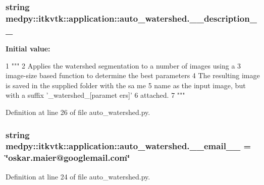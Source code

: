 \hypertarget{namespacemedpy_1_1itkvtk_1_1application_1_1auto__watershed_aba71d5ed7cfbc51114697ad6039219d8}{
\subsubsection[{\_\-\_\-description\_\-\_\-}]{\setlength{\rightskip}{0pt plus 5cm}string {\bf medpy::itkvtk::application::auto\_\-watershed.\_\-\_\-description\_\-\_\-}}}
\label{namespacemedpy_1_1itkvtk_1_1application_1_1auto__watershed_aba71d5ed7cfbc51114697ad6039219d8}
{\bfseries Initial value:}
\begin{DoxyCode}
1 """
2                   Applies the watershed segmentation to a number of images  using
       a
3                   image-size based function to determine the best parameters
4                   The resulting image is saved in the supplied folder with the sa
      me
5                   name as the input image, but with a suffix '_watershed_[paramet
      ers]'
6                   attached.
7                   """
\end{DoxyCode}


Definition at line 26 of file auto\_\-watershed.py.

\hypertarget{namespacemedpy_1_1itkvtk_1_1application_1_1auto__watershed_aedf8e52f6d377bd1b73b4c87c954d12f}{
\subsubsection[{\_\-\_\-email\_\-\_\-}]{\setlength{\rightskip}{0pt plus 5cm}string {\bf medpy::itkvtk::application::auto\_\-watershed.\_\-\_\-email\_\-\_\-} = \char`\"{}oskar.maier@googlemail.com\char`\"{}}}
\label{namespacemedpy_1_1itkvtk_1_1application_1_1auto__watershed_aedf8e52f6d377bd1b73b4c87c954d12f}


Definition at line 24 of file auto\_\-watershed.py.

